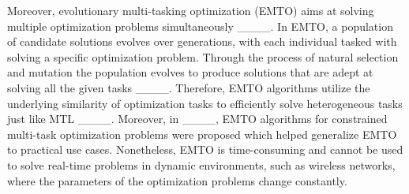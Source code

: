 Moreover,  evolutionary multi-tasking optimization (EMTO) aims at solving multiple optimization problems simultaneously ____.
In EMTO, a population of candidate solutions evolves over generations, with each individual tasked with solving a specific optimization problem. 
Through the process of natural selection and mutation the population evolves to produce solutions that are adept at solving all the given tasks ____. Therefore, EMTO algorithms utilize the underlying similarity of optimization tasks to efficiently solve heterogeneous tasks just like MTL ____. Moreover, in ____, EMTO algorithms for constrained multi-task optimization problems were proposed which helped generalize EMTO to practical use cases. Nonetheless, EMTO is time-consuming and cannot be used to solve real-time problems in dynamic environments, such as wireless networks, where the parameters of the optimization problems change constantly.